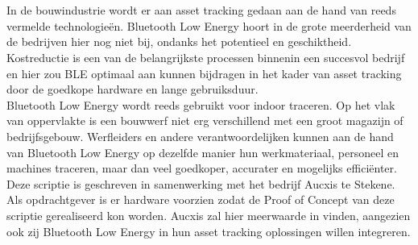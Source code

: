 \section{}%
\label{sec:probleemstelling}


In de bouwindustrie wordt er aan asset tracking gedaan aan de hand van reeds vermelde technologieën. Bluetooth Low Energy hoort in de grote meerderheid van de bedrijven hier nog niet bij, ondanks het potentieel en geschiktheid. Kostreductie is een van de belangrijkste processen binnenin een succesvol bedrijf en hier zou BLE optimaal aan kunnen bijdragen in het kader van asset tracking door de goedkope hardware en lange gebruiksduur.\\

Bluetooth Low Energy wordt reeds gebruikt voor indoor traceren. Op het vlak van oppervlakte is een bouwwerf niet erg verschillend met een groot magazijn of bedrijfsgebouw.
Werfleiders en andere verantwoordelijken kunnen aan de hand van Bluetooth Low Energy op dezelfde manier hun werkmateriaal, personeel en machines traceren, maar dan veel goedkoper, accurater en mogelijks efficiënter. \\

Deze scriptie is geschreven in samenwerking met het bedrijf Aucxis te Stekene. Als opdrachtgever is er hardware voorzien zodat de Proof of Concept van deze scriptie gerealiseerd kon worden. Aucxis zal hier meerwaarde in vinden, aangezien ook zij Bluetooth Low Energy in hun asset tracking oplossingen willen integreren.

\section{}%
\label{sec:onderzoeksvraag}


